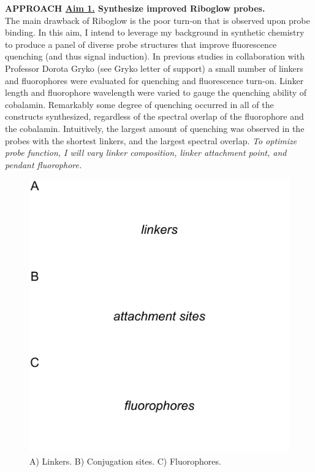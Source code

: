 \textbf{APPROACH \underline{Aim 1.} Synthesize improved Riboglow probes.}\\
The main drawback of Riboglow is the poor turn-on that is observed upon probe binding. In this aim, I intend to leverage my background in synthetic chemistry to produce a panel of diverse probe structures that improve fluorescence quenching (and thus signal induction). In previous studies in collaboration with Professor Dorota Gryko (see Gryko letter of support) a small number of linkers and fluorophores were evaluated for quenching and fluorescence turn-on. Linker length and fluorophore wavelength were varied to gauge the quenching ability of cobalamin. Remarkably some degree of quenching occurred in all of the constructs synthesized, regardless of the spectral overlap of the fluorophore and the cobalamin. Intuitively, the largest amount of quenching was observed in the probes with the shortest linkers, and the largest spectral overlap. \textit{To optimize probe function, I will vary linker composition, linker attachment point, and pendant fluorophore.}

\begin{figure}
\begin{centering}
\includegraphics[width=\textwidth]{figures/aim1.pdf}

\end{centering}
\footnotesize
\caption{\label{figure:aim1}
A) Linkers. B) Conjugation sites. C) Fluorophores.
}
\end{figure}


